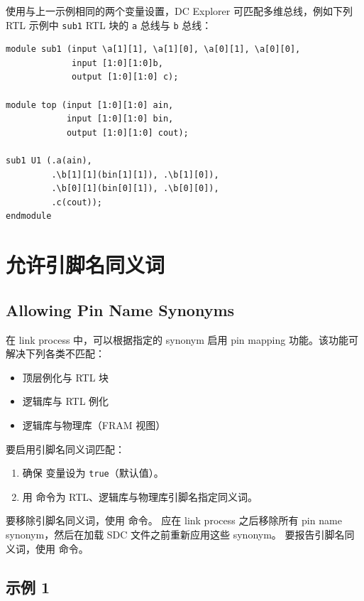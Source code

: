 
使用与上一示例相同的两个变量设置，DC Explorer 可匹配多维总线，例如下列 RTL 示例中 \texttt{sub1} RTL 块的 \texttt{a} 总线与 \texttt{b} 总线：
\begin{lstlisting}
module sub1 (input \a[1][1], \a[1][0], \a[0][1], \a[0][0],
             input [1:0][1:0]b,
             output [1:0][1:0] c);

module top (input [1:0][1:0] ain,
            input [1:0][1:0] bin,
            output [1:0][1:0] cout);

sub1 U1 (.a(ain),
         .\b[1][1](bin[1][1]), .\b[1][0]),
         .\b[0][1](bin[0][1]), .\b[0][0]),
         .c(cout));
endmodule
\end{lstlisting}

\section{允许引脚名同义词}
\subsection*{Allowing Pin Name Synonyms}

在 link process 中，可以根据指定的 synonym 启用 pin mapping 功能。该功能可解决下列各类不匹配：
\begin{itemize}
  \item 顶层例化与 RTL 块
  \item 逻辑库与 RTL 例化
  \item 逻辑库与物理库（FRAM 视图）
\end{itemize}

要启用引脚名同义词匹配：
\begin{enumerate}
  \item 确保  变量设为 \texttt{true}（默认值）。
  \item 用  命令为 RTL、逻辑库与物理库引脚名指定同义词。
\end{enumerate}

要移除引脚名同义词，使用  命令。
应在 link process 之后移除所有 pin name synonym，然后在加载 SDC 文件之前重新应用这些 synonym。
要报告引脚名同义词，使用  命令。

\subsection{示例 1}
